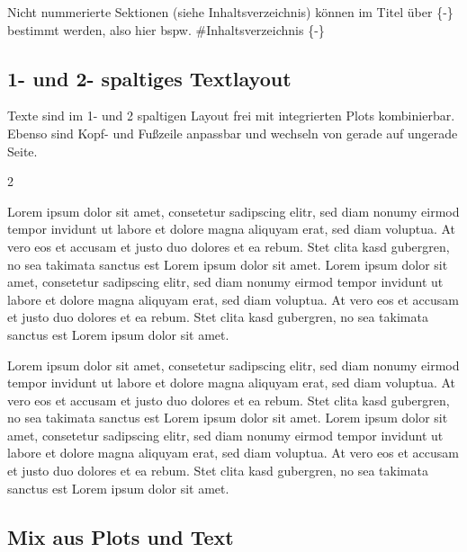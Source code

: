 \documentclass[
  a4paper,
  twoside]{article}
\begin{document}
Nicht nummerierte Sektionen (siehe Inhaltsverzeichnis) können im Titel
über \{-\} bestimmt werden, also hier bspw. \#Inhaltsverzeichnis \{-\}

\newpage

\hypertarget{und-2--spaltiges-textlayout}{%
\subsection{1- und 2- spaltiges
Textlayout}\label{und-2--spaltiges-textlayout}}

Texte sind im 1- und 2 spaltigen Layout frei mit integrierten Plots
kombinierbar. Ebenso sind Kopf- und Fußzeile anpassbar und wechseln von
gerade auf ungerade Seite.

\begin {multicols}{2}

Lorem ipsum dolor sit amet, consetetur sadipscing elitr, sed diam nonumy
eirmod tempor invidunt ut labore et dolore magna aliquyam erat, sed diam
voluptua. At vero eos et accusam et justo duo dolores et ea rebum. Stet
clita kasd gubergren, no sea takimata sanctus est Lorem ipsum dolor sit
amet. Lorem ipsum dolor sit amet, consetetur sadipscing elitr, sed diam
nonumy eirmod tempor invidunt ut labore et dolore magna aliquyam erat,
sed diam voluptua. At vero eos et accusam et justo duo dolores et ea
rebum. Stet clita kasd gubergren, no sea takimata sanctus est Lorem
ipsum dolor sit amet.

\columnbreak

Lorem ipsum dolor sit amet, consetetur sadipscing elitr, sed diam nonumy
eirmod tempor invidunt ut labore et dolore magna aliquyam erat, sed diam
voluptua. At vero eos et accusam et justo duo dolores et ea rebum. Stet
clita kasd gubergren, no sea takimata sanctus est Lorem ipsum dolor sit
amet. Lorem ipsum dolor sit amet, consetetur sadipscing elitr, sed diam
nonumy eirmod tempor invidunt ut labore et dolore magna aliquyam erat,
sed diam voluptua. At vero eos et accusam et justo duo dolores et ea
rebum. Stet clita kasd gubergren, no sea takimata sanctus est Lorem
ipsum dolor sit amet.

\end {multicols}

\newpage

\hypertarget{mix-aus-plots-und-text}{%
\subsection{Mix aus Plots und Text}\label{mix-aus-plots-und-text}}
\end{document}
